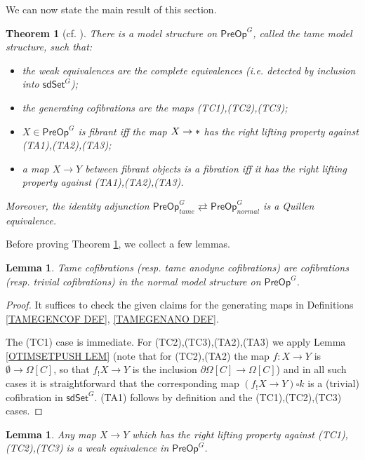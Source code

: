 \documentclass[a4paper,10pt
,draft
]{article}%
\numberwithin{equation}{section}
\numberwithin{figure}{section}
\newtheorem{theorem}[equation]{Theorem}%
\newtheorem{lemma}[equation]{Lemma}%
\theoremstyle{definition} %
\newcommand{\1}{\ensuremath{\mathbbm 1}}%
\begin{document}
We can now state the main result of this section.

\begin{theorem}[{cf. \cite[Thm. 7.19]{CM13b}}]\label{TAMEMS_THM}
	There is a model structure on 
	$\mathsf{PreOp}^G$,
	called the \emph{tame model structure},
	such that:
	\begin{itemize}
		\item the weak equivalences are the complete equivalences (i.e. detected by inclusion into 
		$\mathsf{sdSet}^G$);
		\item the generating cofibrations are the maps (TC1),(TC2),(TC3);
		\item $X \in \mathsf{PreOp}^G$ is fibrant iff
		the map $X \to \**$ has the right lifting property against 
		(TA1),(TA2),(TA3);
		\item a map $X \to Y$ between fibrant objects is a fibration iff
		it has the right lifting property against 
		(TA1),(TA2),(TA3).
	\end{itemize}
	Moreover, the identity adjunction
	$
	\mathsf{PreOp}^G_{tame} 
	\rightleftarrows
	\mathsf{PreOp}^G_{normal} 
	$
	is a Quillen equivalence.
\end{theorem}


Before proving Theorem \ref{TAMEMS_THM},
we collect a few lemmas.

\begin{lemma}\label{TAMECOFCOF_LEM}
	Tame cofibrations (resp. tame anodyne cofibrations) are  cofibrations (resp. trivial cofibrations) in the normal model structure on $\mathsf{PreOp}^G$.
\end{lemma}


\begin{proof}
	It suffices to check the given claims for the generating maps
	in Definitions \ref{TAMEGENCOF DEF}, \ref{TAMEGENANO DEF}.
	
	The (TC1) case is immediate.
	For (TC2),(TC3),(TA2),(TA3)
	we apply 
	Lemma \ref{OTIMSETPUSH LEM}
	(note that for (TC2),(TA2)
	the map $f\colon X \to Y$ is $\emptyset \to \Omega[C]$,
	so that $f_!X \to Y$ is the inclusion
	$\partial \Omega[C] \to \Omega[C]$)
	and in all such cases it is 
	straightforward that the 
	corresponding map $(f_!X \to Y) \square k$
	is a (trivial) cofibration in $\mathsf{sdSet}^G$.
	(TA1) follows by definition and the 
	(TC1),(TC2),(TC3) cases.
\end{proof}



\begin{lemma}\label{TAMETRIVFIB LEM}
	Any map $X \to Y$ which has the right lifting property against 
	(TC1),(TC2),(TC3)
	is a weak equivalence in 
	$\mathsf{PreOp}^G$.
\end{lemma}
\end{document}
